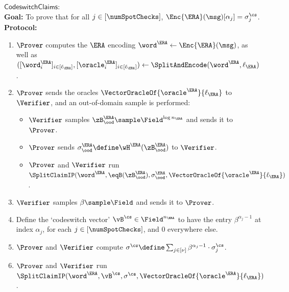\begin{tcolorbox}[breakable, enhanced, colback=white, boxrule=0.65pt]
    $\mathsf{CodeswitchClaims}:$\\
    \textbf{Goal: } To prove that for all $j \in [\numSpotChecks]$, $\Enc{\ERA}(\msg)[\alpha_j] = \sigma^{\cs}_j$.\\
    \textbf{Protocol: } 
    \begin{enumerate}[nolistsep]
        \item $\Prover$ computes the $\ERA$ encoding $\word^{\ERA} \gets \Enc{\ERA}(\msg)$, as well as $([\word^{\ERA}_i]_{i \in [\ell_{\ERA}]}, [\oracle^{\ERA}_i]_{i \in [\ell_{\ERA}]}) \gets \SplitAndEncode(\word^{\ERA}, \ell_{\ERA})$.
        \item $\Prover$ sends the oracles $\VectorOracleOf{\oracle^{\ERA}}{\ell_{\ERA}}$ to $\Verifier$, and an out-of-domain sample is performed:
        \begin{itemize}[nolistsep]
            \item $\Verifier$ samples $\zB^{\ERA}_{\ood} \sample \Field^{\log n_{\ERA}}$ and sends it to $\Prover$.
            \item $\Prover$ sends $\sigma^{\ERA}_{\ood} \define \wH^{\ERA}(\zB^{\ERA}_{\ood})$ to $\Verifier$.
            \item $\Prover$ and $\Verifier$ run $\SplitClaimIP(\word^{\ERA}, \eqB(\zB^{\ERA}_{\ood}), \sigma^{\ERA}_{\ood}, \VectorOracleOf{\oracle^{\ERA}}{\ell_{\ERA}})$.
        \end{itemize}
        \item $\Verifier$ samples $\beta \sample \Field$ and sends it to $\Prover$.
        \item Define the `codeswitch vector' $\vB^{\cs} \in \Field^{n_{\ERA}}$ to have the entry $\beta^{\alpha_j - 1}$ at index $\alpha_j$, for each $j \in [\numSpotChecks]$, and $0$ everywhere else.
        \item $\Prover$ and $\Verifier$ compute $\sigma^{\cs} \define \sum_{j \in [\nu]} \beta^{\alpha_{j} - 1} \cdot \sigma^{\cs}_j$.
        \item $\Prover$ and $\Verifier$ run $\SplitClaimIP(\word^{\ERA}, \vB^{\cs}, \sigma^{\cs}, \VectorOracleOf{\oracle^{\ERA}}{\ell_{\ERA}})$.


\end{enumerate}
\end{tcolorbox}
